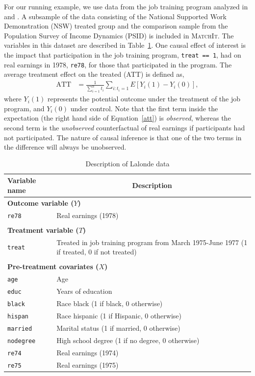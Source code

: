 \documentclass[oneside,letterpaper,titlepage]{article}
\newcommand{\MatchIt}{\textsc{MatchIt}}
\begin{document}
For our running example, we use data from the job training program
analyzed in \citet{lalonde86} and \citet{DehWah99}.  A subsample of
the data consisting of the National Supported Work Demonstration (NSW)
treated group and the comparison sample from the Population Survey of
Income Dynamics (PSID) is included in \MatchIt.  The variables in this
dataset are described in Table~\ref{dwvars}.  One causal effect of
interest is the impact that participation in the job training program,
\texttt{treat == 1}, had on real earnings in 1978, \texttt{re78}, for
those that participated in the program.  The average treatment effect
on the treated (ATT) is defined as,
\begin{align}
  \label{att}
  \text{ATT} & = \frac{1}{\sum_{i=1}^n t_i}\sum_{i:t_i=1} E[Y_i(1) - Y_i(0)],
\end{align}
where $Y_i(1)$ represents the potential outcome under the treatment of
the job program, and $Y_i(0)$ under control.  Note that the first term
inside the expectation (the right hand side of Equation~\ref{att}) is
\emph{observed}, whereas the second term is the \emph{unobserved}
counterfactual of real earnings if participants had not participated.
The nature of causal inference is that one of the two terms in the
difference will always be unobserved.  

\begin{table}[h]
\centering
\begin{tabular}{lp{3in}}
  \hline 
  \multicolumn{1}{l}{Variable name} & \multicolumn{1}{c}{Description} \\
  \hline
  \multicolumn{2}{l}{\textbf{Outcome variable ($Y$)}} \\ 
  \texttt{re78} & Real earnings (1978) \\ \\
  \multicolumn{2}{l}{\textbf{Treatment variable ($T$)}} \\
  \texttt{treat} & Treated in job training program from March 1975-June
  1977 (1 if treated, 0 if not treated)
  \\ \\
  \multicolumn{2}{l}{\textbf{Pre-treatment covariates ($X$)}} \\
  \texttt{age} & Age\\
  \texttt{educ} & Years of education \\
  \texttt{black} & Race black (1 if black, 0 otherwise) \\
  \texttt{hispan} & Race hispanic  (1 if Hispanic, 0 otherwise) \\
  \texttt{married} & Marital status (1 if married, 0 otherwise) \\
  \texttt{nodegree} & High school degree (1 if no degree, 0 otherwise)\\
  \texttt{re74} & Real earnings (1974) \\
  \texttt{re75} & Real earnings (1975) \\ 
  \hline
\end{tabular}\label{lalonde}
\caption{Description of Lalonde data \label{dwvars}}
\end{table}
\end{document}
